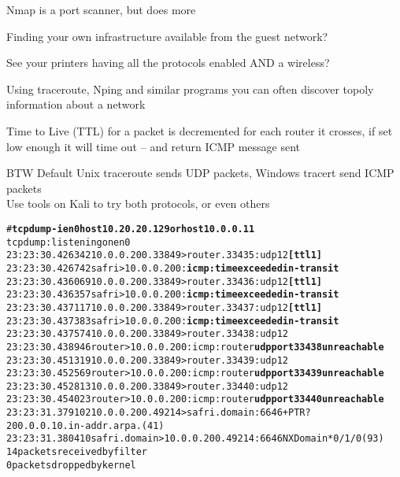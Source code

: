 \documentclass[Screen16to9,17pt]{foils}
\begin{document}


\begin{list2}
\item Nmap is a port scanner, but does more
\item Finding your own infrastructure available from the guest network?
\item See your printers having all the protocols enabled AND a wireless?
\end{list2}



\begin{list2}
\item Using traceroute, Nping and similar programs you can often discover topoly information about a network
\item Time to Live (TTL) for a packet is decremented for each router it crosses, if set low enough it will time out -- and return ICMP message sent
\item BTW Default Unix traceroute sends UDP packets, Windows tracert send ICMP packets\\
Use tools on Kali to try both protocols, or even others
\end{list2}



\begin{alltt}
\footnotesize # {\bfseries tcpdump -i en0 host 10.20.20.129 or host 10.0.0.11}
tcpdump: listening on en0
23:23:30.426342 10.0.0.200.33849 > router.33435: udp 12 {\bf [ttl 1]}
23:23:30.426742 safri > 10.0.0.200: {\bf icmp: time exceeded in-transit}
23:23:30.436069 10.0.0.200.33849 > router.33436: udp 12 {\bf [ttl 1]}
23:23:30.436357 safri > 10.0.0.200: {\bf icmp: time exceeded in-transit}
23:23:30.437117 10.0.0.200.33849 > router.33437: udp 12 {\bf [ttl 1]}
23:23:30.437383 safri > 10.0.0.200: {\bf icmp: time exceeded in-transit}
23:23:30.437574 10.0.0.200.33849 > router.33438: udp 12
23:23:30.438946 router > 10.0.0.200: icmp: router {\bf udp port 33438 unreachable}
23:23:30.451319 10.0.0.200.33849 > router.33439: udp 12
23:23:30.452569 router > 10.0.0.200: icmp: router {\bf udp port 33439 unreachable}
23:23:30.452813 10.0.0.200.33849 > router.33440: udp 12
23:23:30.454023 router > 10.0.0.200: icmp: router {\bf udp port 33440 unreachable}
23:23:31.379102 10.0.0.200.49214 > safri.domain:  6646+ PTR?
200.0.0.10.in-addr.arpa. (41)
23:23:31.380410 safri.domain > 10.0.0.200.49214:  6646 NXDomain* 0/1/0 (93)
14 packets received by filter
0 packets dropped by kernel
\end{alltt}
\end{document}

